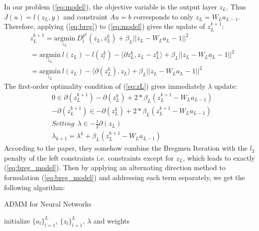 \documentclass[letterpaper, 10 pt, conference]{ieeeconf}  %
\begin{document}
In our problem (\ref{eq:model}), the objective variable is the output layer $z_L$. Thus $J(u) = l(z_L, y)$ and constraint $Au = b$ corresponds to only $z_L = W_La_{L-1}$. Therefore, applying (\ref{eq:breg}) to (\ref{eq:model}) gives the update of $z_L^{k+1}$:
\begin{equation*}
\begin{aligned}
&z_L^{k+1} = \underset{z_L}{\text{argmin}} \: D_l^{p^k}(z_L, z_L^k) + \beta_L||z_L - W_La_L-1||^2\\
&= \underset{z_L}{\text{argmin}} \: l(z_L) -l(z_l^k) 
 - \langle  \partial z_L^k, z_L - z_L^k \rangle +  \beta_L||z_L - W_La_L-1||^2\\
&= \underset{z_L}{\text{argmin}} \: l(z_L) 
 - \langle \partial(z_L^k), z_L \rangle + \beta_L||z_L - W_La_L-1||^2
 \label{eq:zL}
\end{aligned} 
\end{equation*}
The first-order optimality condition of (\ref{eq:zL}) gives immediately $\lambda$ update:
\begin{equation*}
\begin{aligned}
&0 \in \partial(z_L^{k+1}) -  \partial(z_L^k) + 2 * \beta_L(z_L^{k+1} - W_La_{L-1}) \\
&- \partial(z_L^{k+1}) \in - \partial(z_L^k) +  2 * \beta_L(z_L^{k+1} - W_La_{L-1}) \\
&Setting \: \:  \lambda \in-  \frac{1}{2} \partial(z_L) \\
&\lambda_{k+1} = \lambda^k + \beta_L(z_L^{k+1} - W_La_{L-1})
\label{eq:zL}
\end{aligned} 
\end{equation*}
According to the paper, they somehow combine the Bregmen Iteration with the $l_2$ penalty of the left constraints i.e. constraints except for $z_L$, which leads to exactly (\ref{eq:breg_model}). Then by applying an alternating direction method to formulation (\ref{eq:breg_model}) and addressing each term separately, we get the following algorithm:
\begin{algorithm} 
\caption{ADMM for Neural Networks}
\label{alg:goldADMM}
initialize $\{a_l\}^{L}_{l=1}$, $\{z_l\}^{L}_{l=1}$, $\lambda$ and weights\\

\end{algorithm}
\end{document}
